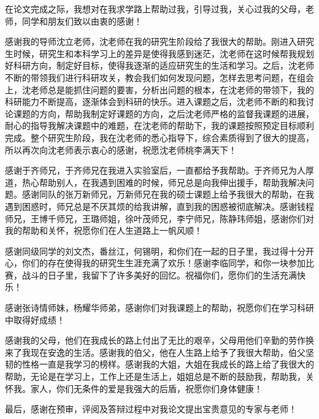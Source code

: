 ﻿

\begin{ack}
在论文完成之际，我想对在我求学路上帮助过我，引导过我，关心过我的父母，老师，同学和朋友们致以由衷的感谢！

感谢我的导师沈立老师，沈老师在我的研究生阶段给了我很大的帮助。刚进入研究生时候，研究生和本科学习上的差异是使得我感到迷茫，沈老师在这时候帮我规划好科研方向，制定好目标，使得我逐渐的适应研究生的生活和学习。之后，沈老师不断的带领我们进行科研攻关，教会我们如何发现问题，怎样去思考问题，在组会上，沈老师总是能抓住问题的要害，分析出问题的根本，在沈老师的带领下，我的科研能力不断提高，逐渐体会到科研的快乐。进入课题之后，沈老师不断的和我讨论课题的方向，帮助我制定好课题的方向，之后沈老师严格的监督我课题的进展，耐心的指导我解决课题中的难题，在沈老师的帮助下，我的课题按照预定目标顺利完成。整个研究生阶段，我在沈老师的悉心指导下，综合素质得到了很大的提高，所以再次向沈老师表示衷心的感谢，祝愿沈老师桃李满天下！

感谢于齐师兄，于齐师兄在我进入实验室后，一直都给予我帮助。于齐师兄为人厚道，热心帮助别人，在我遇到困难的时候，师兄总是向我伸出援手，帮助我解决问题。感谢同队的张万新师兄，万新师兄在我的硕士课题上给予我很大的帮助，在我遇到困惑时，师兄总是不厌其烦的给我讲解，直到我的困惑被彻底解决。感谢钱程师兄，王博千师兄，王璐师姐，徐叶茂师兄，李宁师兄，陈静玮师姐，感谢你们对我的帮助和关怀，祝愿你们在人生道路上一帆风顺！

感谢同级同学的刘文杰，番丝江，何锡明，和你们在一起的日子里，我过得十分开心，你们的存在使得我的研究生生涯充满了欢乐！感谢李临同学，和你一块参加比赛，战斗的日子里，我留下了许多美好的回忆。祝福你们，愿你们的生活充满快乐！

感谢张诗情师妹，杨耀华师弟，感谢你们对我课题上的帮助，祝愿你们在学习科研中取得好成绩！

感谢我的父母，他们在我成长的路上付出了无比的艰辛，父母用他们辛勤的劳作换来了我现在安逸的生活。感谢我的伯父，他在人生路上给予了我很大帮助，伯父坚韧的性格一直是我学习的榜样。感谢我的大姐，大姐在我成长的路上给了我很大的帮助，无论是在学习上，工作上还是生活上，姐姐总是不断的鼓励我，帮助我，关怀我。家人，你们无条件的爱是我强大的后盾，祝愿你们身体健康！

最后，感谢在预审，评阅及答辩过程中对我论文提出宝贵意见的专家与老师！
\end{ack}
